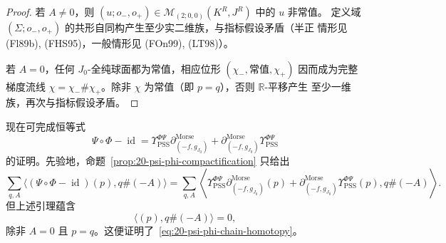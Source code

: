 \begin{proof}
若 $A\neq0$，则 $(u;o_-,o_+)\in\mathcal M_{(2;0,0)}(K^R,J^R)$ 中的 $u$ 非常值。
定义域 $(\Sigma;o_-,o_+)$ 的共形自同构产生至少实二维族，与指标假设矛盾（半正
情形见 (Fl89b), (FHS95)，一般情形见 (FOn99), (LT98)）。

若 $A=0$，任何 $J_0$-全纯球面都为常值，相应位形
$(\chi_-,\text{常值},\chi_+)$ 因而成为完整梯度流线
$\chi=\chi_-\#\chi_+$。除非 $\chi$ 为常值（即 $p=q$），否则 $\mathbb R$-平移产生
至少一维族，再次与指标假设矛盾。
\end{proof}

现在可完成恒等式
\begin{equation}
 \Psi\circ\Phi-\operatorname{id}
 =\Upsilon_{\mathrm{PSS}}^{\Phi\Psi}\partial^{\mathrm{Morse}}_{(-f,g_{J_0})}
 +\partial^{\mathrm{Morse}}_{(-f,g_{J_0})}\Upsilon_{\mathrm{PSS}}^{\Phi\Psi}
 \label{eq:20-psi-phi-chain-homotopy}
\end{equation}
的证明。先验地，命题~\ref{prop:20-psi-phi-compactification} 只给出
\[
 \sum_{q,A}\langle(\Psi\circ\Phi-\operatorname{id})(p),q\#(-A)\rangle
 =\sum_{q,A}\left\langle
 \Upsilon_{\mathrm{PSS}}^{\Phi\Psi}\partial^{\mathrm{Morse}}_{(-f,g_{J_0})}(p)
 +\partial^{\mathrm{Morse}}_{(-f,g_{J_0})}\Upsilon_{\mathrm{PSS}}^{\Phi\Psi}(p),
 q\#(-A)\right\rangle.
\]
但上述引理蕴含
\[
 \langle(p),q\#(-A)\rangle=0,
\]
除非 $A=0$ 且 $p=q$。这便证明了~\eqref{eq:20-psi-phi-chain-homotopy}。
